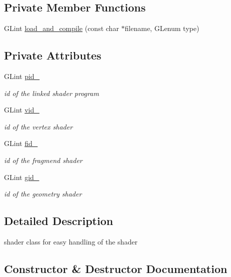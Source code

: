 \subsection*{Private Member Functions}
\begin{DoxyCompactItemize}
\item 
G\+Lint \hyperlink{classShader_a8a092f71dea9d820d1c1e566e757b72e}{load\+\_\+and\+\_\+compile} (const char $\ast$filename, G\+Lenum type)
\end{DoxyCompactItemize}
\subsection*{Private Attributes}
\begin{DoxyCompactItemize}
\item 
G\+Lint \hyperlink{classShader_a60ee8c3fab7e88c16e10ab1c9645b3bf}{pid\+\_\+}
\begin{DoxyCompactList}\small\item\em id of the linked shader program \end{DoxyCompactList}\item 
G\+Lint \hyperlink{classShader_a82849da0db25a51821c30c344ef15b19}{vid\+\_\+}
\begin{DoxyCompactList}\small\item\em id of the vertex shader \end{DoxyCompactList}\item 
G\+Lint \hyperlink{classShader_ad4a72d8f8b1b1545330d3e03bcb77b68}{fid\+\_\+}
\begin{DoxyCompactList}\small\item\em id of the fragmend shader \end{DoxyCompactList}\item 
G\+Lint \hyperlink{classShader_ab2ee206d6a62bc218e1f6f1c0a424cdf}{gid\+\_\+}
\begin{DoxyCompactList}\small\item\em id of the geometry shader \end{DoxyCompactList}\end{DoxyCompactItemize}


\subsection{Detailed Description}
shader class for easy handling of the shader 

\subsection{Constructor \& Destructor Documentation}
